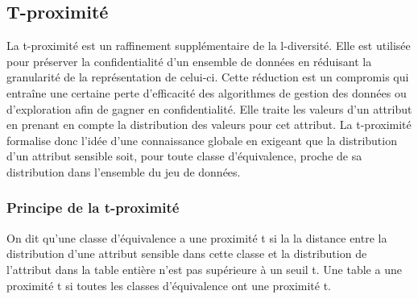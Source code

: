 \subsection{T-proximité}
La t-proximité est un raffinement supplémentaire de la l-diversité. Elle est utilisée pour préserver la confidentialité d'un ensemble de données en réduisant la granularité de la représentation de celui-ci. Cette réduction est un compromis qui entraîne une certaine perte d'efficacité des algorithmes de gestion des données ou d'exploration afin de gagner en confidentialité. Elle traite les valeurs d'un attribut en prenant en compte  la distribution des valeurs pour cet attribut.
La t-proximité formalise donc l’idée d'une connaissance globale en exigeant que la distribution d’un attribut sensible soit, pour toute classe d'équivalence, proche de sa distribution dans l’ensemble du jeu de données. 
\subsubsection{Principe de la t-proximité}
On dit qu'une classe d'équivalence a une proximité t si la la distance entre la distribution d'une attribut sensible dans cette classe et la distribution de l'attribut dans la table entière n'est pas supérieure à un seuil t. Une table a une proximité t si toutes les classes d'équivalence ont une proximité t.